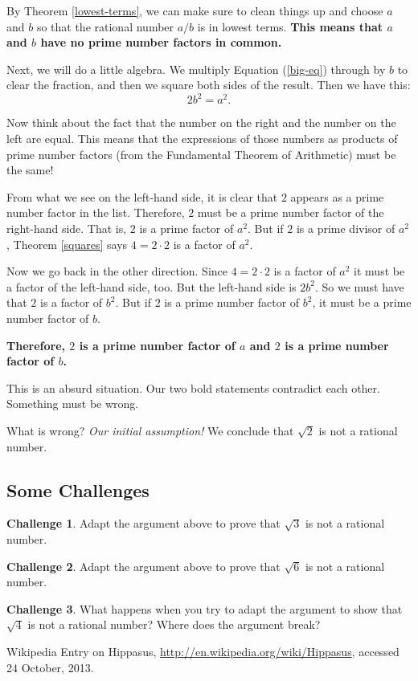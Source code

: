 \documentclass[12pt,letterpaper]{article}
\theoremstyle{definition}
\newtheorem*{challenge}{Challenge}
\begin{document}
By Theorem \ref{lowest-terms}, we can make sure to clean things up and choose $a$ and $b$ so that the rational number $a/b$ is in lowest terms.
\textbf{This means that $a$ and $b$ have no prime number factors in common.}

Next, we will do a little algebra.
We multiply Equation (\ref{big-eq}) through by $b$ to clear the fraction, and then we square both sides of the result.
Then we have this:
\[ 
2b^2 = a^2.
\]

Now think about the fact that the number on the right and the number on the left are equal.
This means that the expressions of those numbers as products of prime number factors (from the Fundamental Theorem of Arithmetic) must be the same!

From what we see on the left-hand side, it is clear that $2$ appears as a prime number factor in the list.
Therefore, $2$ must be a prime number factor of the right-hand side. That is, $2$ is a prime factor of $a^2$.
But if $2$ is a prime divisor of $a^2$, Theorem \ref{squares} says  $4 = 2\cdot 2$ is a factor of $a^2$.

Now we go back in the other direction.
Since $4 = 2\cdot 2$ is a factor of $a^2$ it must be a factor of the left-hand side, too.
But the left-hand side is $2 b^2$.
So we must have that $2$ is a factor of $b^2$.
But if $2$ is a prime number factor of $b^2$, it must be a prime number factor of $b$.

\textbf{Therefore, $2$ is a prime number factor of $a$ and $2$ is a prime number factor of $b$.}

This is an absurd situation.
Our two bold statements contradict each other.
Something must be wrong.

What is wrong?
\textit{Our initial assumption!}
We conclude that $\sqrt{2}$ is not a rational number.


\subsection*{Some Challenges}

\begin{challenge}
Adapt the argument above to prove that $\sqrt{3}$ is not a rational number.
\end{challenge}

\begin{challenge}
Adapt the argument above to prove that $\sqrt{6}$ is not a rational number.
\end{challenge}

\begin{challenge}
What happens when you try to adapt the argument to show that $\sqrt{4}$ is not a rational number?
Where does the argument break?
\end{challenge}


\begin{thebibliography}{9}

    Wikipedia Entry on Hippasus, 
    \url{http://en.wikipedia.org/wiki/Hippasus},
    accessed 24 October, 2013.

\end{thebibliography}
\end{document}
